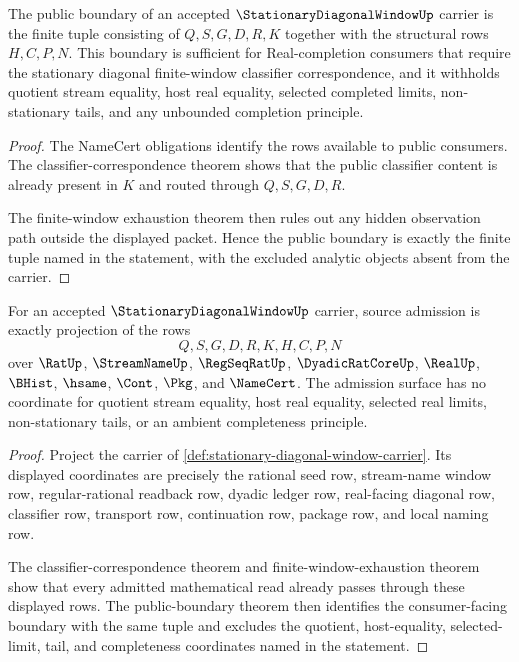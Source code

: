 \begin{theorem}
\label{thm:stationary-diagonal-window-public-boundary}
The public boundary of an accepted $\StationaryDiagonalWindowUp$ carrier is the finite tuple consisting of $Q,S,G,D,R,K$ together with the structural rows $H,C,P,N$. This boundary is sufficient for Real-completion consumers that require the stationary diagonal finite-window classifier correspondence, and it withholds quotient stream equality, host real equality, selected completed limits, non-stationary tails, and any unbounded completion principle.
\end{theorem}
\begin{proof}
The NameCert obligations identify the rows available to public consumers. The classifier-correspondence theorem shows that the public classifier content is already present in $K$ and routed through $Q,S,G,D,R$.

The finite-window exhaustion theorem then rules out any hidden observation path outside the displayed packet. Hence the public boundary is exactly the finite tuple named in the statement, with the excluded analytic objects absent from the carrier.
\end{proof}

\begin{theorem}
\label{thm:stationary-diagonal-window-carrier-source-obligation}
For an accepted $\StationaryDiagonalWindowUp$ carrier, source admission is exactly projection of the rows
$$
Q,S,G,D,R,K,H,C,P,N
$$
over $\RatUp$, $\StreamNameUp$, $\RegSeqRatUp$, $\DyadicRatCoreUp$, $\RealUp$, $\BHist$, $\hsame$, $\Cont$, $\Pkg$, and $\NameCert$. The admission surface has no coordinate for quotient stream equality, host real equality, selected real limits, non-stationary tails, or an ambient completeness principle.
\end{theorem}
\begin{proof}
Project the carrier of \autoref{def:stationary-diagonal-window-carrier}. Its displayed coordinates are precisely the rational seed row, stream-name window row, regular-rational readback row, dyadic ledger row, real-facing diagonal row, classifier row, transport row, continuation row, package row, and local naming row.

The classifier-correspondence theorem and finite-window-exhaustion theorem show that every admitted mathematical read already passes through these displayed rows. The public-boundary theorem then identifies the consumer-facing boundary with the same tuple and excludes the quotient, host-equality, selected-limit, tail, and completeness coordinates named in the statement.
\end{proof}

